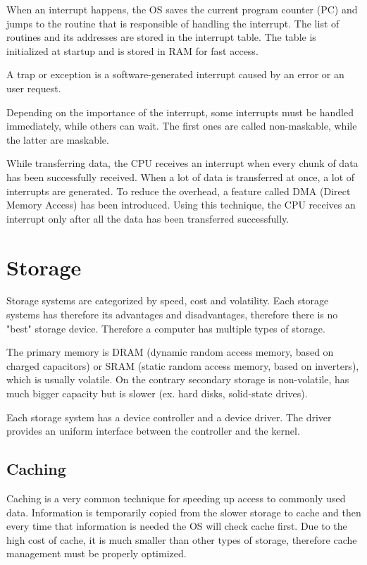 
When an interrupt happens, the OS saves the current program counter (PC) and jumps to the routine that is responsible of handling the interrupt. The list of routines and its addresses are stored in the interrupt table. The table is initialized at startup and is stored in RAM for fast access.

A trap or exception is a software-generated interrupt caused by an error or an user request.

Depending on the importance of the interrupt, some interrupts must be handled immediately, while others can wait. The first ones are called non-maskable, while the latter are maskable.

While transferring data, the CPU receives an interrupt when every chunk of data has been successfully received. When a lot of data is transferred at once, a lot of interrupts are generated. To reduce the overhead, a feature called DMA (Direct Memory Access) has been introduced. Using this technique, the CPU receives an interrupt only after all the data has been transferred successfully.

\section{Storage}

Storage systems are categorized by speed, cost and volatility. Each storage systems has therefore its advantages and disadvantages, therefore there is no "best" storage device. Therefore a computer has multiple types of storage.

The primary memory is DRAM (dynamic random access memory, based on charged capacitors) or SRAM (static random access memory, based on inverters), which is usually volatile. On the contrary secondary storage is non-volatile, has much bigger capacity but is slower (ex. hard disks, solid-state drives).

Each storage system has a device controller and a device driver. The driver provides an uniform interface between the controller and the kernel.

\subsection{Caching}

Caching is a very common technique for speeding up access to commonly used data. Information is temporarily copied from the slower storage to cache and then every time that information is needed the OS will check cache first. Due to the high cost of cache, it is much smaller than other types of storage, therefore cache management must be properly optimized.

